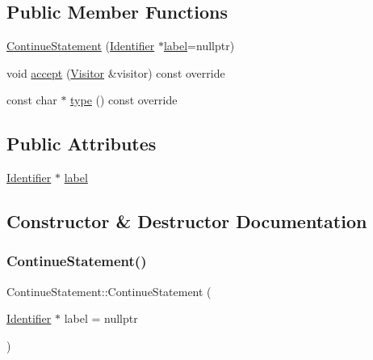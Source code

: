\subsection*{Public Member Functions}
\begin{DoxyCompactItemize}
\item 
\hyperlink{struct_continue_statement_a45152addd01adf9e6d10c0af8505128c}{Continue\+Statement} (\hyperlink{struct_identifier}{Identifier} $\ast$\hyperlink{struct_continue_statement_a4bf8883a88736fa6ce4341e9029db194}{label}=nullptr)
\item 
void \hyperlink{struct_continue_statement_a9288fc77078160a2709a6329f1fe4838}{accept} (\hyperlink{struct_visitor}{Visitor} \&visitor) const override
\item 
const char $\ast$ \hyperlink{struct_continue_statement_a08b73034c5d273c3c4cbad00b252913f}{type} () const override
\end{DoxyCompactItemize}
\subsection*{Public Attributes}
\begin{DoxyCompactItemize}
\item 
\hyperlink{struct_identifier}{Identifier} $\ast$ \hyperlink{struct_continue_statement_a4bf8883a88736fa6ce4341e9029db194}{label}
\end{DoxyCompactItemize}


\subsection{Constructor \& Destructor Documentation}
\mbox{\label{struct_continue_statement_a45152addd01adf9e6d10c0af8505128c}} 
\subsubsection{\texorpdfstring{Continue\+Statement()}{ContinueStatement()}}
{\footnotesize\ttfamily Continue\+Statement\+::\+Continue\+Statement (\begin{DoxyParamCaption}\item[{\hyperlink{struct_identifier}{Identifier} $\ast$}]{label = {\ttfamily nullptr} }\end{DoxyParamCaption})\hspace{0.3cm}{\ttfamily [inline]}}



